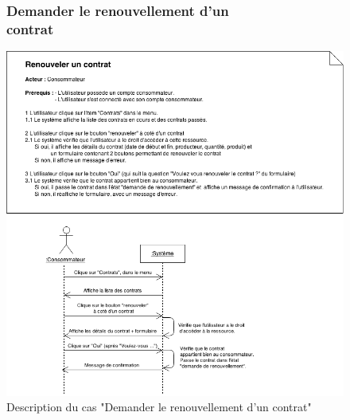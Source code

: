 \documentclass[12pt]{report}
\begin{document}
\begin{figure}[!h]
\centering
\subsubsection{Demander le renouvellement d'un contrat~~~~~~~~~~~~~~~~~~~~~~~~~~~}
\includegraphics[width=1.\textwidth]{./ressources/desc_UC_demander_renouvellement.png}
\caption{Description du cas "Demander le renouvellement d'un contrat"}
\end{figure}
\clearpage
\end{document}
